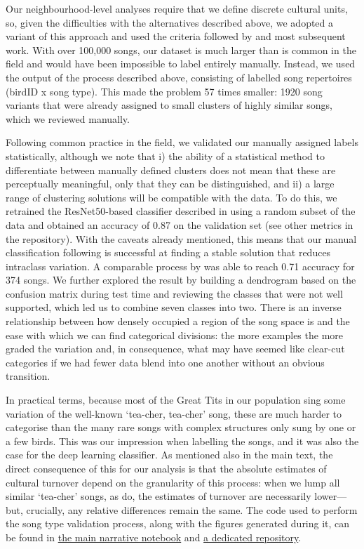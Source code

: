Our neighbourhood-level analyses require that we define discrete cultural units, so, given the difficulties with the alternatives described above, we adopted a variant of this approach and used the criteria followed by \textcite{mcgregor1982b} and most subsequent work. With over 100,000 songs, our dataset is much larger than is common in the field and would have been impossible to label entirely manually. Instead, we used the output of the process described above, consisting of labelled song repertoires (birdID x song type). This made the problem 57 times smaller: 1920 song variants that were already assigned to small clusters of highly similar songs, which we reviewed manually.

Following common practice in the field, we validated our manually assigned labels statistically, although we note that i) the ability of a statistical method to differentiate between manually defined clusters does not mean that these are perceptually meaningful, only that they can be distinguished, and ii) a large range of clustering solutions will be compatible with the data. To do this, we retrained the ResNet50-based classifier described in \textcite{merinorecalde2023} using a random subset of the data and obtained an accuracy of 0.87 on the validation set (see other metrics in the repository). With the caveats already mentioned, this means that our manual classification following \textcite{mcgregor1982b} is successful at finding a stable solution that reduces intraclass variation. A comparable process by \textcite{fayet2014} was able to reach 0.71 accuracy for 374 songs. We further explored the result by building a dendrogram based on the confusion matrix during test time and reviewing the classes that were not well supported, which led us to combine seven classes into two. There is an inverse relationship between how densely occupied a region of the song space is and the ease with which we can find categorical divisions: the more examples the more graded the variation and, in consequence, what may have seemed like clear-cut categories if we had fewer data blend into one another without an obvious transition.

In practical terms, because most of the Great Tits in our population sing some variation of the well-known ‘tea-cher, tea-cher’ song, these are much harder to categorise than the many rare songs with complex structures only sung by one or a few birds. This was our impression when labelling the songs, and it was also the case for the deep learning classifier. As mentioned also in the main text, the direct consequence of this for our analysis is that the absolute estimates of cultural turnover depend on the granularity of this process: when we lump all similar ‘tea-cher’ songs, as \textcite{mcgregor1982b} do, the estimates of turnover are necessarily lower---but, crucially, any relative differences remain the same.
The code used to perform the song type validation process, along with the figures generated during it, can be found in \href{https://github.com/nilomr/wytham-songtype-validation/blob/main/notebooks/4_train-model.ipynb}{the main narrative notebook} and \href{https://github.com/nilomr/wytham-songtype-validation}{a dedicated repository}.

